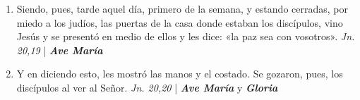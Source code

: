 \documentclass[../../devocionario.tex]{subfiles}
\begin{document}
\begin{enumerate}
        \item Siendo, pues, tarde aquel día, primero de la semana, y estando cerradas, por miedo a los judíos, 
            las puertas de la casa donde estaban los discípulos, vino Jesús y se presentó en medio de ellos y 
            les dice: «la paz sea con vosotros». \textit{Jn. 20,19} | \textbf{\textit{Ave María}}

        \item Y en diciendo esto, les mostró las manos y el costado. Se gozaron, pues, 
            los discípulos al ver al Señor. \textit{Jn. 20,20} | \textbf{\textit{Ave María}} y \textbf{\textit{Gloria}}

    \end{enumerate}
\end{document}
